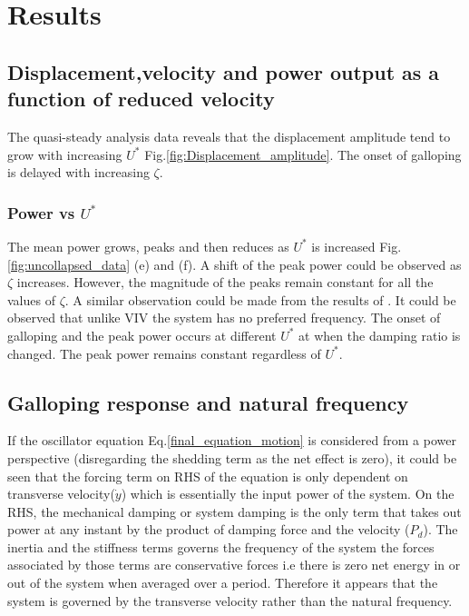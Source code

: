 
\section{Results}


\subsection{Displacement,velocity and power output as a function of reduced velocity}


 The quasi-steady analysis data reveals that the displacement amplitude tend to grow with increasing $U^*$ Fig.\ref{fig:Displacement_amplitude}. The onset of galloping is delayed with increasing $\zeta$. 
 
 \subsubsection*{Power vs $U^*$}
 
 The mean power grows, peaks and then reduces as $U^*$ is increased Fig.\ref{fig:uncollapsed_data} (e) and (f). A shift of the peak power could be observed as $\zeta$ increases. However, the magnitude of the peaks remain constant for all the values of $\zeta$. A similar observation could be made from the results of \cite{Barrero-Gil2010a}. It could be observed that unlike VIV the  system has no preferred frequency. The onset of galloping and the peak power occurs at different $U^*$ at when the damping ratio is changed. The peak power remains constant regardless of $U^*$.
 
 \subsection{Galloping response and natural frequency}
 
 If the oscillator equation Eq.\eqref{final_equation_motion} is considered from a power perspective (disregarding the shedding term as the net effect is zero), it could be seen that the forcing term on RHS of the equation is only dependent on transverse velocity($\dot{y}$) which is essentially the input power of the system. On the RHS, the mechanical damping or system damping is the only term that takes out power at any instant by the product of damping force and the velocity ($P_d$). The inertia and the stiffness terms governs the frequency of the system the forces associated by those terms are conservative forces i.e there is zero net energy in or out of the system when averaged over a period. Therefore it appears that the system is governed by the transverse velocity rather than the natural frequency.
 

